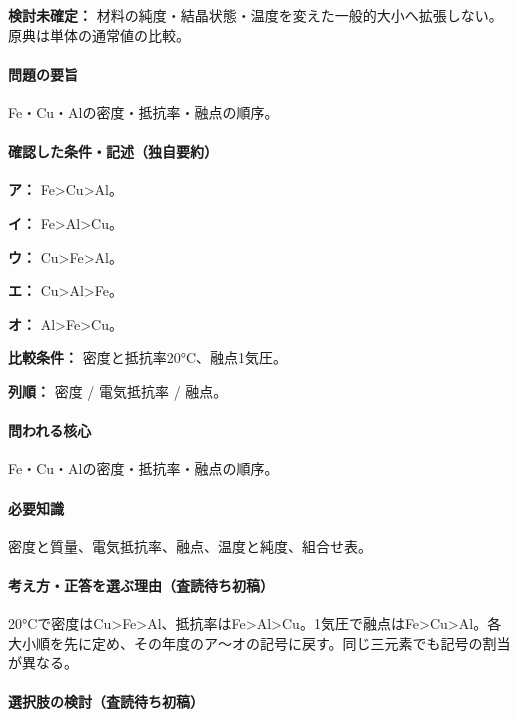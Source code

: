 \par\textbf{検討未確定：} 材料の純度・結晶状態・温度を変えた一般的大小へ拡張しない。原典は単体の通常値の比較。

\paragraph{問題の要旨} Fe・Cu・Alの密度・抵抗率・融点の順序。

\paragraph{確認した条件・記述（独自要約）}\mbox{}\par

\noindent\textbf{ア：} Fe>Cu>Al。\par

\noindent\textbf{イ：} Fe>Al>Cu。\par

\noindent\textbf{ウ：} Cu>Fe>Al。\par

\noindent\textbf{エ：} Cu>Al>Fe。\par

\noindent\textbf{オ：} Al>Fe>Cu。\par

\noindent\textbf{比較条件：} 密度と抵抗率20°C、融点1気圧。\par

\noindent\textbf{列順：} 密度 / 電気抵抗率 / 融点。\par

\paragraph{問われる核心} Fe・Cu・Alの密度・抵抗率・融点の順序。

\paragraph{必要知識} 密度と質量、電気抵抗率、融点、温度と純度、組合せ表。

\paragraph{考え方・正答を選ぶ理由（査読待ち初稿）} 20°Cで密度はCu>Fe>Al、抵抗率はFe>Al>Cu。1気圧で融点はFe>Cu>Al。各大小順を先に定め、その年度のア〜オの記号に戻す。同じ三元素でも記号の割当が異なる。

\paragraph{選択肢の検討（査読待ち初稿）}\mbox{}\par

